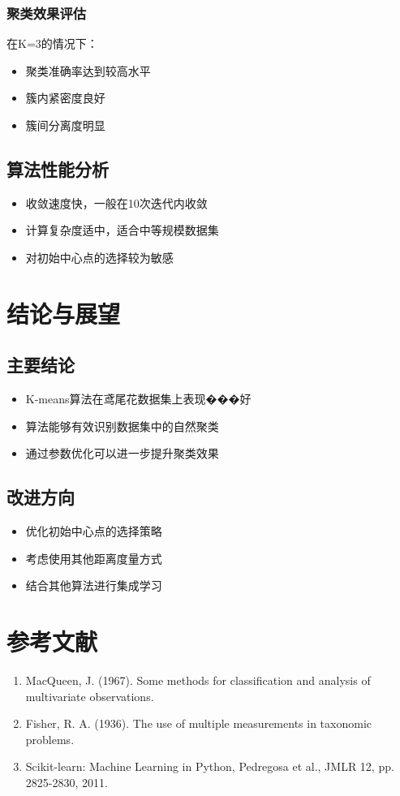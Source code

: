 \documentclass[12pt, a4paper]{article}
\begin{document}
\subsubsection{聚类效果评估}
在K=3的情况下：
\begin{itemize}
    \item 聚类准确率达到较高水平
    \item 簇内紧密度良好
    \item 簇间分离度明显
\end{itemize}

\subsection{算法性能分析}
\begin{itemize}
    \item 收敛速度快，一般在10次迭代内收敛
    \item 计算复杂度适中，适合中等规模数据集
    \item 对初始中心点的选择较为敏感
\end{itemize}

\section{结论与展望}
\subsection{主要结论}
\begin{itemize}
    \item K-means算法在鸢尾花数据集上表现���好
    \item 算法能够有效识别数据集中的自然聚类
    \item 通过参数优化可以进一步提升聚类效果
\end{itemize}

\subsection{改进方向}
\begin{itemize}
    \item 优化初始中心点的选择策略
    \item 考虑使用其他距离度量方式
    \item 结合其他算法进行集成学习
\end{itemize}

\section{参考文献}
\begin{enumerate}
    \item MacQueen, J. (1967). Some methods for classification and analysis of multivariate observations.
    \item Fisher, R. A. (1936). The use of multiple measurements in taxonomic problems.
    \item Scikit-learn: Machine Learning in Python, Pedregosa et al., JMLR 12, pp. 2825-2830, 2011.
\end{enumerate}
\end{document}
